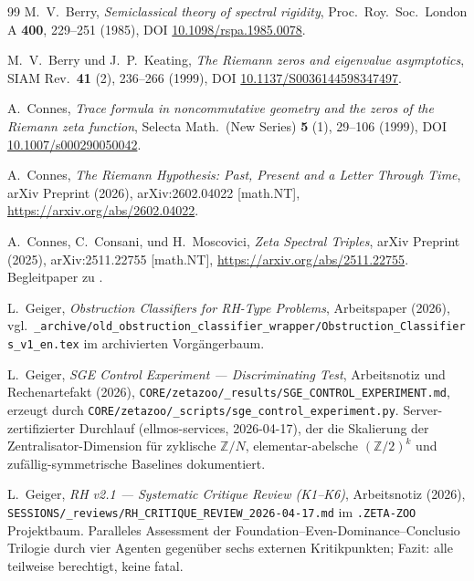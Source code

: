 \documentclass[11pt]{article}
\theoremstyle{definition}
\theoremstyle{remark}
\begin{document}
\begin{thebibliography}{99}
M.~V.~Berry, \emph{Semiclassical theory of spectral rigidity},
Proc.\ Roy.\ Soc.\ London A \textbf{400}, 229--251 (1985), DOI
\href{https://doi.org/10.1098/rspa.1985.0078}{10.1098/rspa.1985.0078}.

M.~V.~Berry und J.~P.~Keating, \emph{The Riemann zeros and
eigenvalue asymptotics}, SIAM Rev.\ \textbf{41} (2), 236--266 (1999),
DOI
\href{https://doi.org/10.1137/S0036144598347497}{10.1137/S0036144598347497}.

A.~Connes, \emph{Trace formula in noncommutative geometry and the
zeros of the Riemann zeta function}, Selecta Math.\ (New Series)
\textbf{5} (1), 29--106 (1999), DOI
\href{https://doi.org/10.1007/s000290050042}{10.1007/s000290050042}.

A.~Connes, \emph{The Riemann Hypothesis: Past, Present and a
Letter Through Time}, arXiv Preprint (2026), arXiv:2602.04022
[math.NT], \url{https://arxiv.org/abs/2602.04022}.

A.~Connes, C.~Consani, und H.~Moscovici, \emph{Zeta Spectral
Triples}, arXiv Preprint (2025), arXiv:2511.22755 [math.NT],
\url{https://arxiv.org/abs/2511.22755}. Begleitpaper zu
\cite{Connes2026}.

L.~Geiger, \emph{Obstruction Classifiers for RH-Type Problems},
Arbeitspaper (2026), vgl.\ \texttt{\_archive/old\_obstruction\_classifier\_wrapper/Obstruction\_Classifiers\_v1\_en.tex}
im archivierten Vorgängerbaum.

L.~Geiger, \emph{SGE Control Experiment --- Discriminating Test},
Arbeitsnotiz und Rechenartefakt (2026),
\texttt{CORE/zetazoo/\_results/SGE\_CONTROL\_EXPERIMENT.md},
erzeugt durch
\texttt{CORE/zetazoo/\_scripts/sge\_control\_experiment.py}.
Server-zertifizierter Durchlauf (ellmos-services, 2026-04-17), der die
Skalierung der Zentralisator-Dimension für zyklische $\mathbb{Z}/N$,
elementar-abelsche $(\mathbb{Z}/2)^k$ und zufällig-symmetrische
Baselines dokumentiert.

L.~Geiger, \emph{RH v2.1 --- Systematic Critique Review (K1--K6)},
Arbeitsnotiz (2026), \texttt{SESSIONS/\_reviews/RH\_CRITIQUE\_REVIEW\_2026-04-17.md}
im \texttt{.ZETA-ZOO} Projektbaum.
Paralleles Assessment der Foundation--Even-Dominance--Conclusio
Trilogie durch vier Agenten gegenüber sechs externen Kritikpunkten; Fazit: alle teilweise berechtigt,
keine fatal.


\end{thebibliography}
\end{document}
